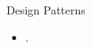 \begin{frame}{Design Patterns}                                                                                                              
\begin{itemize}
\item .
\end{itemize}
\end{frame}
